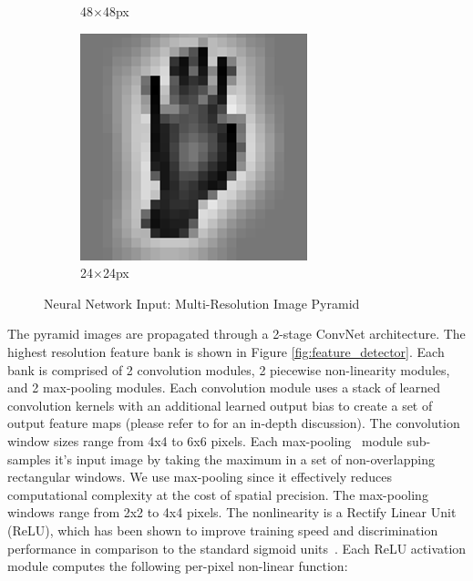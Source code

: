 \begin{figure}[ht]
\begin{subfigure}{0.3\textwidth}
                \caption{\footnotesize 48$\times$48px}
        \end{subfigure}
        \begin{subfigure}{0.3\textwidth}
                \centering
                \includegraphics[width=\textwidth]{figures_1_hand_tracking/pyramid3}
                \caption{\footnotesize 24$\times$24px}
        \end{subfigure}
        \caption{Neural Network Input: Multi-Resolution Image Pyramid}
        \label{fig:pyramid}
\end{figure}

The pyramid images are propagated through a 2-stage ConvNet architecture. The highest resolution feature bank is shown in Figure \ref{fig:feature_detector}. Each bank is comprised of 2 convolution modules, 2 piecewise non-linearity modules, and 2 max-pooling modules. Each convolution module uses a stack of learned convolution kernels with an additional learned output bias to create a set of output feature maps (please refer to \cite{LeCunMNIST} for an in-depth discussion). The convolution window sizes range from 4x4 to 6x6 pixels. Each max-pooling~\cite{nagi} module sub-samples it's input image by taking the maximum in a set of non-overlapping rectangular windows. We use max-pooling since it effectively reduces computational complexity at the cost of spatial precision. The max-pooling windows range from 2x2 to 4x4 pixels. The nonlinearity is a Rectify Linear Unit (ReLU), which has been shown to improve training speed and discrimination performance in comparison to the standard sigmoid units~\cite{ImageNet_NIPS2012_0534}. Each ReLU activation module computes the following per-pixel non-linear function:

